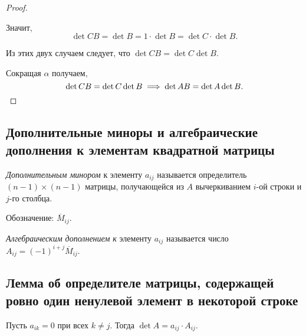 \begin{proof}
\begin{description}
        Значит,
        \begin{equation*}
            \det CB = \det B = 1 \cdot \det B = \det C \cdot \det B
        .\end{equation*}
    \end{description}

    Из этих двух случаем следует, что $\det CB = \det C \det B$.

    Сокращая $\alpha$ получаем,
    \begin{equation*}
        \det CB = \det C \det B \implies \det AB = \det A \det B
    .\qedhere\end{equation*}
\end{proof}

\begin{comment}
    Пусть $A \in M_n$, $A_{\text{ул}}$ -- её улучшенный ступенчатый вид.
    \begin{equation*}
        \det A \neq 0 \iff A_{\text{ул}} = E
    .\end{equation*}
\end{comment}


\subsection{Дополнительные миноры и алгебраические дополнения к элементам квадратной матрицы}
\begin{definition}
    \textit{Дополнительным минором} к элементу $a_{ij}$ называется определитель $(n-1) \times (n-1)$ матрицы, получающейся из $A$ вычеркиванием $i$-ой строки и $j$-го столбца.

    Обозначение: $\overline{M}_{ij}$.
\end{definition}

\begin{definition}
    \textit{Алгебраическим дополнением к} элементу $a_{ij}$ называется число $A_{ij} = (-1)^{i+j} \overline{M}_{ij}$.
\end{definition}


\subsection{Лемма об определителе матрицы, содержащей ровно один ненулевой элемент в некоторой строке}
\begin{lemma}
    Пусть $a_{ik} = 0$ при всех $k \neq j$. Тогда $\det A = a_{ij} \cdot A_{ij}$.
\end{lemma}

